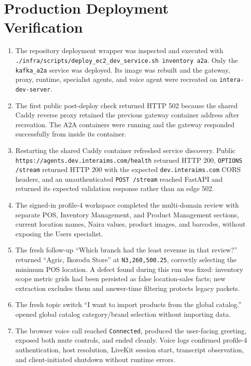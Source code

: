 \documentclass[10pt]{article}
\begin{document}
\section{Production Deployment Verification}
\begin{enumerate}[leftmargin=18pt,itemsep=5pt]
\item The repository deployment wrapper was inspected and executed with \texttt{./infra/scripts/deploy\_ec2\_dev\_service.sh inventory a2a}. Only the \texttt{kafka\_a2a} service was deployed. Its image was rebuilt and the gateway, proxy, runtime, specialist agents, and voice agent were recreated on \texttt{intera-dev-server}.
\item The first public post-deploy check returned HTTP 502 because the shared Caddy reverse proxy retained the previous gateway container address after recreation. The A2A containers were running and the gateway responded successfully from inside its container.
\item Restarting the shared Caddy container refreshed service discovery. Public \texttt{https://agents.dev.interaims.com/health} returned HTTP 200, \texttt{OPTIONS /stream} returned HTTP 200 with the expected \texttt{dev.interaims.com} CORS headers, and an unauthenticated \texttt{POST /stream} reached FastAPI and returned its expected validation response rather than an edge 502.
\item The signed-in profile-4 workspace completed the multi-domain review with separate POS, Inventory Management, and Product Management sections, current location names, Naira values, product images, and barcodes, without exposing the Users specialist.
\item The fresh follow-up ``Which branch had the least revenue in that review?'' returned ``Agric, Ikorodu Store'' at \texttt{N3,260,500.25}, correctly selecting the minimum POS location. A defect found during this run was fixed: inventory scope metric grids had been persisted as false location-sales facts; new extraction excludes them and answer-time filtering protects legacy packets.
\item The fresh topic switch ``I want to import products from the global catalog.'' opened global catalog category/brand selection without importing data.
\item The browser voice call reached \texttt{Connected}, produced the user-facing greeting, exposed both mute controls, and ended cleanly. Voice logs confirmed profile-4 authentication, host resolution, LiveKit session start, transcript observation, and client-initiated shutdown without runtime errors.

\end{enumerate}
\end{document}
